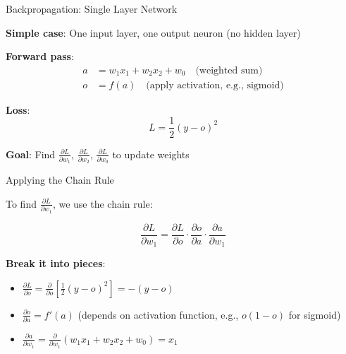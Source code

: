 \documentclass[aspectratio=169]{beamer}\usepackage[]{graphicx}\usepackage[]{xcolor}
\begin{document}
\begin{frame}{Backpropagation: Single Layer Network}

\textbf{Simple case}: One input layer, one output neuron (no hidden layer)

\vfill

\textbf{Forward pass}:
\begin{align*}
a &= w_1 x_1 + w_2 x_2 + w_0 \quad \text{(weighted sum)} \\
o &= f(a) \quad \text{(apply activation, e.g., sigmoid)}
\end{align*}

\vfill

\textbf{Loss}:
\[
L = \frac{1}{2}(y - o)^2
\]

\vfill

\textbf{Goal}: Find $\frac{\partial L}{\partial w_1}$, $\frac{\partial L}{\partial w_2}$, $\frac{\partial L}{\partial w_0}$ to update weights

\end{frame}

\begin{frame}{Applying the Chain Rule}

To find $\frac{\partial L}{\partial w_1}$, we use the chain rule:

\vfill

\[
\frac{\partial L}{\partial w_1} = \frac{\partial L}{\partial o} \cdot \frac{\partial o}{\partial a} \cdot \frac{\partial a}{\partial w_1}
\]

\vfill

\textbf{Break it into pieces}:

\begin{itemize}
    \item $\displaystyle \frac{\partial L}{\partial o} = \frac{\partial}{\partial o} \left[\frac{1}{2}(y - o)^2\right] = -(y - o)$
    
    \vfill
    
    \item $\displaystyle \frac{\partial o}{\partial a} = f'(a)$ (depends on activation function, e.g., $o(1-o)$ for sigmoid)
    
    \vfill
    
    \item $\displaystyle \frac{\partial a}{\partial w_1} = \frac{\partial}{\partial w_1}(w_1 x_1 + w_2 x_2 + w_0) = x_1$
\end{itemize}

\end{frame}
\end{document}
